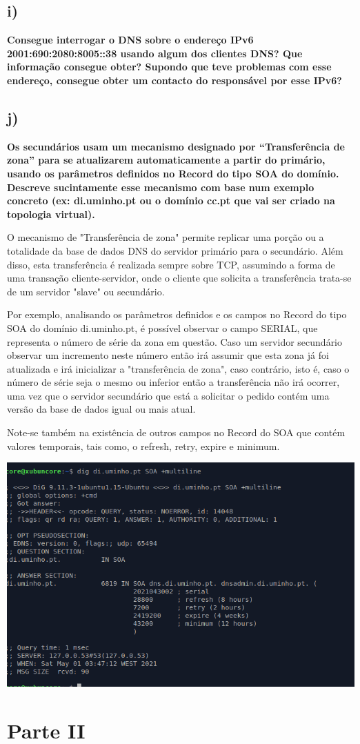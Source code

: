 \documentclass[a4paper]{article}
\begin{document}
\subsection{ i)} \textbf{ Consegue interrogar o DNS sobre o endereço IPv6 2001:690:2080:8005::38 usando algum dos clientes DNS? Que informação consegue obter? Supondo que teve problemas com esse endereço, consegue obter um contacto do responsável por esse IPv6?}

\newpage

\subsection{ j)} \textbf{ Os secundários usam um mecanismo designado por “Transferência de zona” para se atualizarem automaticamente a partir do primário, usando os parâmetros definidos no Record do tipo SOA do domínio. Descreve sucintamente esse mecanismo com base num exemplo concreto (ex: di.uminho.pt ou o domínio cc.pt que vai ser criado na topologia virtual).}\par

\qquad O mecanismo de "Transferência de zona" permite replicar uma porção ou a totalidade da base de 
dados DNS do servidor primário para o secundário. Além disso, esta transferência é realizada sempre sobre TCP, assumindo a forma de uma transação cliente-servidor, onde o cliente que solicita a transferência trata-se de um servidor "slave" ou secundário.\par
\qquad  Por exemplo, analisando os parâmetros definidos e os campos no Record do tipo SOA do domínio di.uminho.pt, é possível observar o campo SERIAL, que representa o número de série da zona em questão.  Caso um servidor secundário observar um incremento neste número então irá assumir que esta zona já foi atualizada e irá inicializar a "transferência de zona", caso contrário, isto é, caso o número de série seja o mesmo ou inferior então a transferência não irá ocorrer, uma vez que o servidor secundário que está a solicitar o pedido contém uma versão da base de dados igual ou mais atual.\par
\qquad Note-se também na existência de outros campos no Record do SOA que contém valores temporais, tais como, o refresh, retry, expire e minimum.
	
\begin{center}
\includegraphics[scale=0.5]{images/SOA}
\end{center}

\newpage

\section{Parte II }
\end{document}
